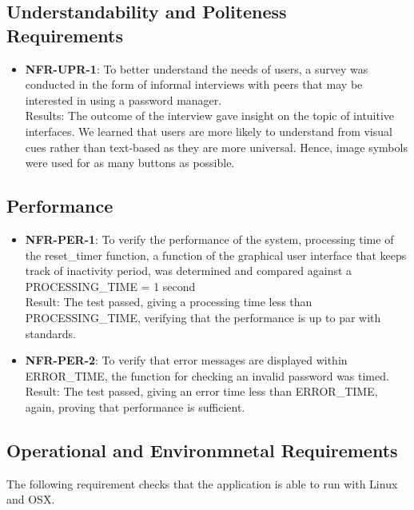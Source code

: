 \documentclass[12pt, titlepage]{article}
\begin{document}
	\subsection{Understandability and Politeness Requirements}

		\begin{itemize}

			\item \textbf{NFR-UPR-1}: To better understand the needs of users, a survey was conducted in the form of informal interviews with peers that may be interested in using a password manager.\\
			Results: The outcome of the interview gave insight on the topic of intuitive interfaces. We learned that users are more likely to understand from visual cues rather than text-based as they are more universal. Hence, image symbols were used for as many buttons as possible.

		\end{itemize}

	\subsection{Performance}

		\begin{itemize}

			\item \textbf{NFR-PER-1}: To verify the performance of the system, processing time of the reset\_timer function, a function of the graphical user interface that keeps track of inactivity period, was determined and compared against a PROCESSING\_TIME = 1 second\\
			Result: The test passed, giving a processing time less than PROCESSING\_TIME, verifying that the performance is up to par with standards.

			\item \textbf{NFR-PER-2}: To verify that error messages are displayed within ERROR\_TIME, the function for checking an invalid password was timed.\\
			Result: The test passed, giving an error time less than ERROR\_TIME, again, proving that performance is sufficient.

		\end{itemize}

	\subsection{Operational and Environmnetal Requirements}
		The following requirement checks that the application is able to run with Linux and OSX.
\end{document}

